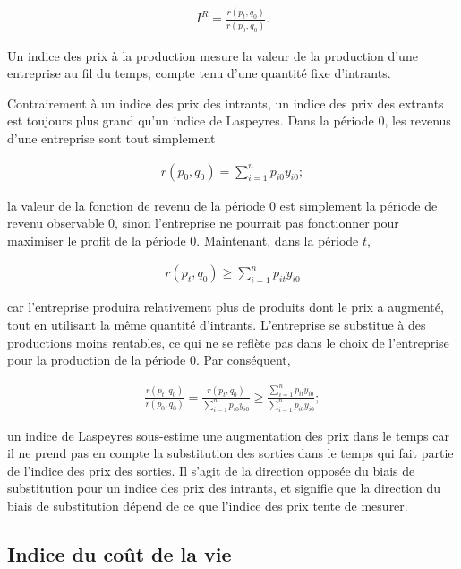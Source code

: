 \documentclass[]{article}
\begin{document}
\begin{align*}
I^{R} = \frac{r(p_{t}, q_{0})}{r(p_{0}, q_{0})}.
\end{align*}

Un indice des prix à la production mesure la valeur de la production d'une entreprise au fil du temps, compte tenu d'une quantité fixe d'intrants.

Contrairement à un indice des prix des intrants, un indice des prix des extrants est toujours plus grand qu'un indice de Laspeyres. Dans la période 0, les revenus d'une entreprise sont tout simplement

\begin{align*}
r(p_{0}, q_{0}) = \sum_{i = 1}^{n} p_{i0} y_{i0};
\end{align*}

la valeur de la fonction de revenu de la période 0 est simplement la période de revenu observable 0, sinon l'entreprise ne pourrait pas fonctionner pour maximiser le profit de la période 0. Maintenant, dans la période \(t\),

\begin{align*}
r(p_{t}, q_{0}) \geq \sum_{i = 1}^{n} p_{it} y_{i0}
\end{align*}

car l'entreprise produira relativement plus de produits dont le prix a augmenté, tout en utilisant la même quantité d'intrants. L'entreprise se substitue à des productions moins rentables, ce qui ne se reflète pas dans le choix de l'entreprise pour la production de la période 0. Par conséquent,

\begin{align*}
\frac{r(p_{t}, q_{0})}{r(p_{0}, q_{0})} = \frac{r(p_{t}, q_{0})}{\sum_{i = 1}^{n} p_{i0} y_{i0}} \geq \frac{\sum_{i = 1}^{n} p_{it} y_{i0}}{\sum_{i = 1 }^{n} p_{i0} y_{i0}};
\end{align*}

un indice de Laspeyres sous-estime une augmentation des prix dans le temps car il ne prend pas en compte la substitution des sorties dans le temps qui fait partie de l'indice des prix des sorties. Il s'agit de la direction opposée du biais de substitution pour un indice des prix des intrants, et signifie que la direction du biais de substitution dépend de ce que l'indice des prix tente de mesurer.

\hypertarget{indice-du-couxfbt-de-la-vie}{%
\subsection{Indice du coût de la vie}\label{indice-du-couxfbt-de-la-vie}}
\end{document}
